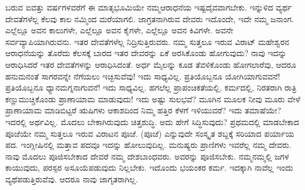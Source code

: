 \vskip -1pt

ಬರುವ ಐವತ್ತು ವರ್ಷಗಳವರೆಗೆ ಈ ಮಾತೃಭೂಮಿಯೇ ನಮ್ಮ\break ಆರಾಧನೆಯ ಇಷ್ಟದೈವವಾಗಬೇಕು. ಇನ್ನುಳಿದ ವ್ಯರ್ಥ ದೇವತೆಗಳೆಲ್ಲ ಕೆಲವು ಕಾಲ ನಮ್ಮಿಂದ ಮರೆಯಾಗಲಿ. ಜಾಗ್ರತನಾಗಿರುವ ದೇವರು ಇದೊಂದೇ, ಇದೇ ನಮ್ಮ ಜನಾಂಗ. ಎಲ್ಲೆಲ್ಲೂ ಅವನ ಕಾಲುಗಳೇ, ಎಲ್ಲೆಲ್ಲೂ ಅವನ ಕೈಗಳೇ, ಎಲ್ಲೆಲ್ಲೂ ಅವನ ಕಿವಿಗಳೇ. ಅವನೇ ಸರ್ವವ್ಯಾಪಿಯಾಗಿರುವನು. ಇತರ ದೇವತೆಗಳೆಲ್ಲ ನಿದ್ರಿಸುತ್ತಿರುವರು. ನಮ್ಮ ಸುತ್ತಲೂ ಇರುವ ವಿರಾಟ್​ ಮಹೇಶ್ವರನ ಆರಾಧನೆಯನ್ನು ತೊರೆದು ಕೆಲಸಕ್ಕೆ ಬಾರದ ಇತರ ದೇವರನ್ನು ಏಕೆ ಅರಸಿಕೊಂಡು ಹೋಗುವುದು? ನಾವು ಇದನ್ನು ಆರಾಧಿಸಿದರೆ ಇತರ ದೇವತೆಗಳನ್ನು ಆರಾಧಿಸಿದಂತೆ. ಅರ್ಧ ಮೈಲನ್ನು ಕೂಡ ತೆವಳಿಕೊಂಡು ಹೋಗಲಾರೆವು, ಆದರೂ ಹನುಮನಂತೆ ಸಾಗರವನ್ನೇ ನೆಗೆಯಲು ಇಚ್ಛಿಸುವೆವು! ಇದು ಸಾಧ್ಯವಿಲ್ಲ. ಪ್ರತಿಯೊಬ್ಬನೂ ಯೋಗಿಯಾಗುವವನೆ! ಪ್ರತಿಯೊಬ್ಬನೂ ಧ್ಯಾನಮಗ್ನನಾಗುವನೆ! ಇದು ಸಾಧ್ಯವಿಲ್ಲ. ಹಗಲೆಲ್ಲ ಪ್ರಾಪಂಚಿಕತೆಯಲ್ಲಿ, ಕರ್ಮದಲ್ಲಿ, ನಿರತರಾಗಿ ರಾತ್ರಿ ಕಣ್ಣುಮುಚ್ಚಿಕೊಂಡು ಪ್ರಾಣಾಯಾಮ ಮಾಡುವುದು! ಇದು ಅಷ್ಟು ಸುಲಭವೆ? ಮೂಗಿನ ಮೂಲಕ ನೀವು ಮೂರು ವೇಳೆ ಪ್ರಾಣಾಯಾಮ ಮಾಡಿಬಿಟ್ಟರೆ ಋಷಿಗಳು ಆಕಾಶದಿಂದ ನಿಮ್ಮ ಹತ್ತಿರ ಕೆಳಗೆ ಇಳಿಯುವರೆ? ಇದು ತಮಾಷೆಯೇ? ಇದರಲ್ಲಿ ಅರ್ಥವಿಲ್ಲ. ಮೊದಲು ಬೇಕಾಗಿರುವುದು ಚಿತ್ತಶುದ್ಧಿ. ಅದು ಹೇಗೆ ಸಿದ್ಧಿಸುವುದು? ಪ್ರಥಮದಲ್ಲಿ ಮಾಡಬೇಕಾದ ಪೂಜೆಯೇ ನಮ್ಮ ಸುತ್ತಲೂ ಇರುವ ವಿರಾಟನ ಪೂಜೆ.  (ಪೂಜೆ) ಎನ್ನುವುದೇ ಸಂಸ್ಕೃತ ಶಬ್ದಕ್ಕೆ ಸರಿಯಾದ ಪರ್ಯಾಯ ಪದ. ಇಂಗ್ಲೀಷಿನಲ್ಲಿ ಮತ್ತಾವ ಪದವೂ ಇದನ್ನು ಹೋಲುವುದಿಲ್ಲ. ಮನುಷ್ಯರು ಪ್ರಾಣಿಗಳು ಇವರೆಲ್ಲ ನಮ್ಮ ದೇವರು. ನಾವು ಮೊದಲು ಪೂಜಿಸಬೇಕಾದ ದೇವರೆ ನಮ್ಮ ದೇಶಬಾಂಧವರು. ಅವರನ್ನು ಪೂಜಿಸಬೇಕು. ನಮ್ಮನಮ್ಮಲ್ಲಿ ಜಗಳ ಕಾಯುವುದು, ಪರಸ್ಪರ ಅಸೂಯೆ\break ಪಡುವುದು ನಿಲ್ಲಬೇಕು. ಇದೊಂದು ಭಯಂಕರ ಕರ್ಮ. ಇದಕ್ಕಾಗಿ ನಾವೆಲ್ಲ ಇಂದು ವ್ಯಥೆಪಡುತ್ತಿರುವೆವು. ಆದರೂ ನಾವು ಜಾಗೃತರಾಗಿಲ್ಲ.

\vskip -1pt

